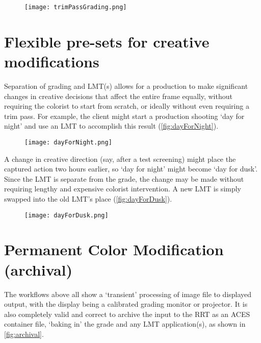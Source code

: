 \begin{figure}[H]
\begin{center}
    \texttt{[image: trimPassGrading.png]}
\caption{}
\label{fig:trimPassGrading}
\end{center}
\end{figure}

\section{Flexible pre-sets for creative modifications}
Separation of grading and LMT(s) allows for a production to make significant changes in creative decisions that affect the entire frame equally, without requiring the colorist to start from scratch, or ideally without even requiring a trim pass. For example, the client might start a production shooting `day for night' and use an LMT to accomplish this result (\autoref{fig:dayForNight}).

\begin{figure}[H]
\begin{center}
    \texttt{[image: dayForNight.png]}
\caption{}
\label{fig:dayForNight}
\end{center}
\end{figure}
 
A change in creative direction (say, after a test screening) might place the captured action two hours earlier, so `day for night' might become `day for dusk'. Since the LMT is separate from the grade, the change may be made without requiring lengthy and expensive colorist intervention. A new LMT is simply swapped into the old LMT's place (\autoref{fig:dayForDusk}).

\begin{figure}[H]
\begin{center}
    \texttt{[image: dayForDusk.png]}
\caption{}
\label{fig:dayForDusk}
\end{center}
\end{figure}

\section{Permanent Color Modification (archival)}
The workflows above all show a `transient' processing of image file to displayed output, with the display being a calibrated grading monitor or projector. It is also completely valid and correct to archive the input to the RRT as an ACES container file, `baking in' the grade and any LMT application(s), as shown in \autoref{fig:archival}.

